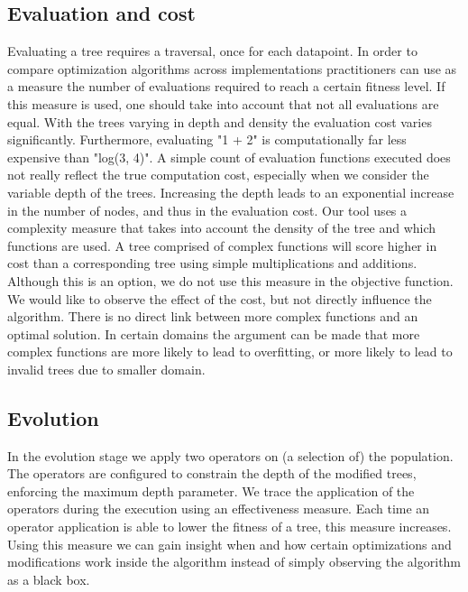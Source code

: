 \subsection{Evaluation and cost}
Evaluating a tree requires a traversal, once for each datapoint. In order to compare optimization algorithms across implementations practitioners can use as a measure the number of evaluations required to reach a certain fitness level. If this measure is used, one should take into account that not all evaluations are equal. With the trees varying in depth and density the evaluation cost varies significantly. Furthermore, evaluating "1 + 2" is computationally far less expensive than "log(3, 4)". A simple count of evaluation functions executed does not really reflect the true computation cost, especially when we consider the variable depth of the trees. Increasing the depth leads to an exponential increase in the number of nodes, and thus in the evaluation cost.
Our tool uses a complexity measure that takes into account the density of the tree and which functions are used. A tree comprised of complex functions will score higher in cost than a corresponding tree using simple multiplications and additions. Although this is an option, we do not use this measure in the objective function. We would like to observe the effect of the cost, but not directly influence the algorithm. There is no direct link between more complex functions and an optimal solution. In certain domains the argument can be made that more complex functions are more likely to lead to overfitting, or more likely to lead to invalid trees due to smaller domain.

\subsection{Evolution}
In the evolution stage we apply two operators on (a selection of) the population. The operators are configured to constrain the depth of the modified trees, enforcing the maximum depth parameter.
We trace the application of the operators during the execution using an effectiveness measure. Each time an operator application is able to lower the fitness of a tree, this measure increases. Using this measure we can gain insight when and how certain optimizations and modifications work inside the algorithm instead of simply observing the algorithm as a black box.

